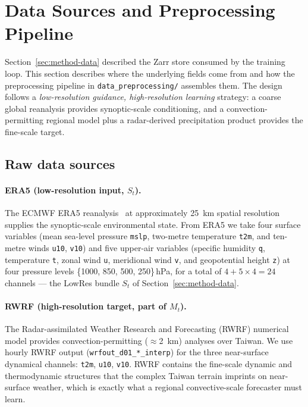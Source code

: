 \section{Data Sources and Preprocessing Pipeline}
\label{sec:method-datasources}

Section~\ref{sec:method-data} described the Zarr store consumed by the training loop. This section describes where the underlying fields come from and how the preprocessing pipeline in \texttt{data\_preprocessing/} assembles them. The design follows a \emph{low-resolution guidance, high-resolution learning} strategy: a coarse global reanalysis provides synoptic-scale conditioning, and a convection-permitting regional model plus a radar-derived precipitation product provides the fine-scale target.

\subsection{Raw data sources}
\label{sec:method-datasources-raw}

\paragraph{ERA5 (low-resolution input, $S_t$).} The ECMWF ERA5 reanalysis~\citep{hersbach2020era5} at approximately \SI{25}{\kilo\metre} spatial resolution supplies the synoptic-scale environmental state. From ERA5 we take four surface variables (mean sea-level pressure \texttt{mslp}, two-metre temperature \texttt{t2m}, and ten-metre winds \texttt{u10}, \texttt{v10}) and five upper-air variables (specific humidity \texttt{q}, temperature \texttt{t}, zonal wind \texttt{u}, meridional wind \texttt{v}, and geopotential height \texttt{z}) at four pressure levels \{1000, 850, 500, 250\}\,\si{\hecto\pascal}, for a total of $4 + 5 \times 4 = 24$ channels --- the LowRes bundle $S_t$ of Section~\ref{sec:method-data}.

\paragraph{RWRF (high-resolution target, part of $M_t$).} The Radar-assimilated Weather Research and Forecasting (RWRF) numerical model provides convection-permitting ($\approx$\SI{2}{\kilo\metre}) analyses over Taiwan. We use hourly RWRF output (\texttt{wrfout\_d01\_*\_interp}) for the three near-surface dynamical channels: \texttt{t2m}, \texttt{u10}, \texttt{v10}. RWRF contains the fine-scale dynamic and thermodynamic structures that the complex Taiwan terrain imprints on near-surface weather, which is exactly what a regional convective-scale forecaster must learn.

